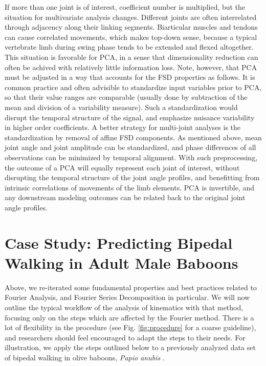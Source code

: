 If more than one joint is of interest, coefficient number is multiplied, but the situation for multivariate analysis changes.
Different joints are often interrelated through adjacency along their linking segments.
Biarticular muscles and tendons can cause correlated movements, which makes top-down sense, because a typical vertebrate limb during swing phase tends to be extended and flexed altogether.
This situation is favorable for PCA, in a sense that dimensionality reduction can often be achived with relatively little information loss.
Note, however, that PCA must be adjusted in a way that accounts for the FSD properties as follows.
It is common practice and often advisible to standardize input variables prior to PCA, so that their value ranges are comparable (usually done by subtraction of the mean and division of a variability measure).
Such a standardization would disrupt the temporal structure of the signal, and emphasize nuisance variability in higher order coefficients.
A better strategy for multi-joint analyses is the standardization by removal of affine FSD components.
As mentioned above, mean joint angle and joint amplitude can be standardized, and phase differences of all observations can be minimized by temporal alignment.
With such preprocessing, the outcome of a PCA will equally represent each joint of interest, without disrupting the temporal structure of the joint angle profiles, and benefitting from intrinsic correlations of movements of the limb elements.
PCA is invertible, and any downstream modeling outcomes can be related back to the original joint angle profiles.

\FloatBarrier\clearpage
\section{Case Study: Predicting Bipedal Walking in Adult Male Baboons}
\label{casestudy}
Above, we re-iterated some fundamental properties and best practices related to Fourier Analysis, and Fourier Series Decomposition in particular.
We will now outline the typical workflow of the analysis of kinematics with that method, focusing only on the steps which are affected by the Fourier method.
There is a lot of flexibility in the procedure (see Fig. \ref{fig:procedure} for a coarse guideline), and researchers should feel encouraged to adapt the steps to their needs.
For illustration, we apply the steps outlined below to a previously analyzed data set of bipedal walking in olive baboons, \emph{Papio anubis} \citep{Druelle2021}.

